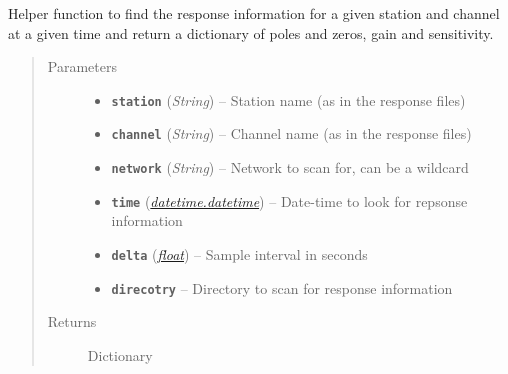 \documentclass[a4paper,10pt,english]{sphinxmanual}
\begin{document}
\begin{fulllineitems}
\label{modules:mag_calc._find_resp}
Helper function to find the response information for a given station and
channel at a given time and return a dictionary of poles and zeros, gain
and sensitivity.
\begin{quote}\begin{description}
\item[{Parameters}] \leavevmode\begin{itemize}
\item {} 
\textbf{\texttt{station}} (\emph{String}) -- Station name (as in the response files)

\item {} 
\textbf{\texttt{channel}} (\emph{String}) -- Channel name (as in the response files)

\item {} 
\textbf{\texttt{network}} (\emph{String}) -- Network to scan for, can be a wildcard

\item {} 
\textbf{\texttt{time}} (\href{https://docs.python.org/library/datetime.html\#datetime.datetime}{\emph{datetime.datetime}}) -- Date-time to look for repsonse information

\item {} 
\textbf{\texttt{delta}} (\href{https://docs.python.org/library/functions.html\#float}{\emph{float}}) -- Sample interval in seconds

\item {} 
\textbf{\texttt{direcotry}} -- Directory to scan for response information

\end{itemize}

\item[{Returns}] \leavevmode
Dictionary

\end{description}\end{quote}

\end{fulllineitems}

\end{document}
